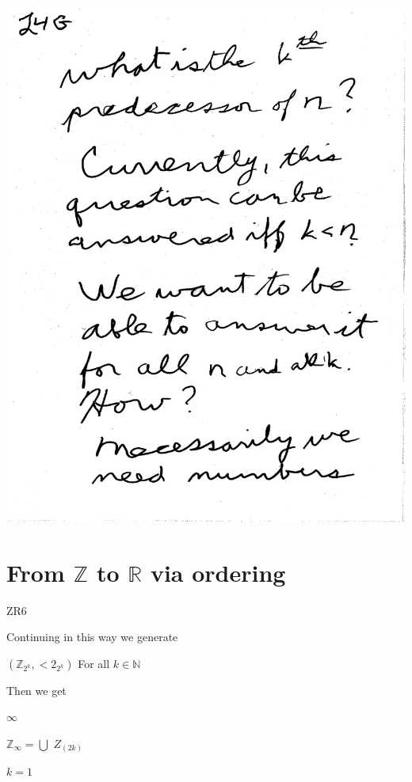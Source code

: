 \documentclass[10pt,a4paper]{article}
\begin{document}
{{\includegraphics[scale=0.5]{Pages/generateN7.pdf}

\newpage


\newpage

\section{From $\mathbb{Z}$ to $\mathbb{R}$ via ordering}


ZR6

 
Continuing in this way we generate 

$(\mathbb{Z}_{2^k},<2_{2^k})$ For all $k\in\mathbb{N}$
                     


Then we get 

\quad\quad\quad$\infty$
           
$\mathbb{Z}_{\infty} = \bigcup$ $Z_{(2k)}$ 

  \quad\quad $k=1$

}}
\end{document}
